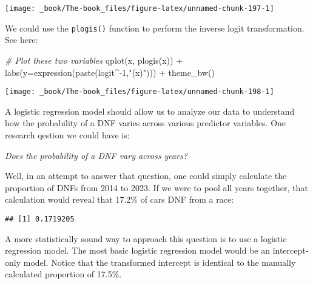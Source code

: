 \documentclass[
]{book}
\newenvironment{Shaded}{\begin{snugshade}}{\end{snugshade}}
\newcommand{\AttributeTok}[1]{\textcolor[rgb]{0.77,0.63,0.00}{#1}}
\newcommand{\CommentTok}[1]{\textcolor[rgb]{0.56,0.35,0.01}{\textit{#1}}}
\newcommand{\DecValTok}[1]{\textcolor[rgb]{0.00,0.00,0.81}{#1}}
\newcommand{\FunctionTok}[1]{\textcolor[rgb]{0.00,0.00,0.00}{#1}}
\newcommand{\NormalTok}[1]{#1}
\newcommand{\SpecialCharTok}[1]{\textcolor[rgb]{0.00,0.00,0.00}{#1}}
\newcommand{\StringTok}[1]{\textcolor[rgb]{0.31,0.60,0.02}{#1}}
\begin{document}
\begin{center}\texttt{[image: \_book/The-book\_files/figure-latex/unnamed-chunk-197-1]} \end{center}

We could use the \texttt{plogis()} function to perform the inverse logit transformation. See here:

\begin{Shaded}
\begin{Highlighting}[]
\CommentTok{\# Plot these two variables}
\FunctionTok{qplot}\NormalTok{(x, }\FunctionTok{plogis}\NormalTok{(x)) }\SpecialCharTok{+}
  \FunctionTok{labs}\NormalTok{(}\AttributeTok{y=}\FunctionTok{expression}\NormalTok{(}\FunctionTok{paste}\NormalTok{(logit}\SpecialCharTok{\^{}{-}}\DecValTok{1}\NormalTok{,}\StringTok{"(x)"}\NormalTok{))) }\SpecialCharTok{+}
  \FunctionTok{theme\_bw}\NormalTok{()}
\end{Highlighting}
\end{Shaded}

\begin{center}\texttt{[image: \_book/The-book\_files/figure-latex/unnamed-chunk-198-1]} \end{center}

A logistic regression model should allow us to analyze our data to understand how the probability of a DNF varies across various predictor variables. One research qestion we could have is:

\emph{Does the probability of a DNF vary across years?}

Well, in an attempt to answer that question, one could simply calculate the proportion of DNFs from 2014 to 2023. If we were to pool all years together, that calculation would reveal that 17.2\% of cars DNF from a race:

\begin{Shaded}
\end{Shaded}

\begin{verbatim}
## [1] 0.1719205
\end{verbatim}

A more statistically sound way to approach this question is to use a logistic regression model. The most basic logistic regression model would be an intercept-only model. Notice that the transformed intercept is identical to the manually calculated proportion of 17.5\%.
\end{document}
